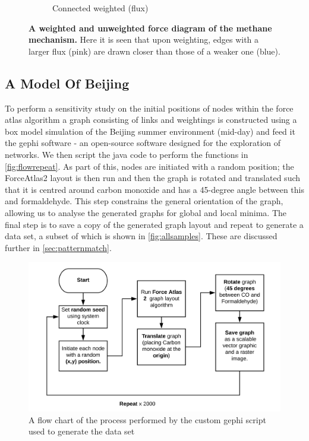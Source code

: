 \begin{figure}[H]
\begin{subfigure}[b]{.4\textwidth}
     \caption{Connected weighted (flux)}
     \end{subfigure}
        \caption{\textbf{A weighted and unweighted force diagram of the methane mechanism.} Here it is seen that upon weighting, edges with a larger flux (pink) are drawn closer than those of a weaker one (blue).}
      \label{fig:resmeth}
\end{figure}


\subsection{A Model Of Beijing}
To perform a sensitivity study on the initial positions of nodes within the force atlas algorithm a graph consisting of links and weightings is constructed using a box model simulation of the Beijing summer environment (mid-day) and feed it the gephi software \citep{gephi} - an open-source software designed for the exploration of networks. We then script the java code to perform the functions in \autoref{fig:flowrepeat}. As part of this, nodes are initiated with a random position; the ForceAtlas2 layout is then run and then the graph is rotated and translated such that it is centred around carbon monoxide and has a 45-degree angle between this and formaldehyde. This step constrains the general orientation of the graph, allowing us to analyse the generated graphs for global and local minima. The final step is to save a copy of the generated graph layout and repeat to generate a data set, a subset of which is shown in  \autoref{fig:allsamples}. These are discussed further in \autoref{sec:patternmatch}.

    \begin{figure}[H]
         \centering
     \includegraphics[width=\textwidth]{figures_c1/flowrepeat.png}
     \caption{ A flow chart of the process performed by the custom gephi script used to generate the data set}
     \label{fig:flowrepeat}
     \end{figure}

